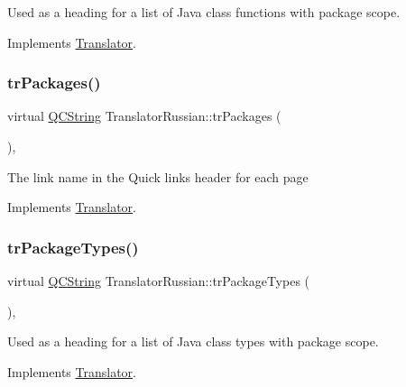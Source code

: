 Used as a heading for a list of Java class functions with package scope. 

Implements \mbox{\hyperlink{class_translator}{Translator}}.

\mbox{\label{class_translator_russian_a0571259b8eacd374cdfd4f0e310a602c}} 
\subsubsection{\texorpdfstring{trPackages()}{trPackages()}}
{\footnotesize\ttfamily virtual \mbox{\hyperlink{class_q_c_string}{Q\+C\+String}} Translator\+Russian\+::tr\+Packages (\begin{DoxyParamCaption}{ }\end{DoxyParamCaption})\hspace{0.3cm}{\ttfamily [inline]}, {\ttfamily [virtual]}}

The link name in the Quick links header for each page 

Implements \mbox{\hyperlink{class_translator}{Translator}}.

\mbox{\label{class_translator_russian_a618ff1f395840dad7f0bcb77f432339e}} 
\subsubsection{\texorpdfstring{trPackageTypes()}{trPackageTypes()}}
{\footnotesize\ttfamily virtual \mbox{\hyperlink{class_q_c_string}{Q\+C\+String}} Translator\+Russian\+::tr\+Package\+Types (\begin{DoxyParamCaption}{ }\end{DoxyParamCaption})\hspace{0.3cm}{\ttfamily [inline]}, {\ttfamily [virtual]}}

Used as a heading for a list of Java class types with package scope. 

Implements \mbox{\hyperlink{class_translator}{Translator}}.

\mbox{\label{class_translator_russian_ab87f430b4572a51e3b4c5edceac8dd36}} 
